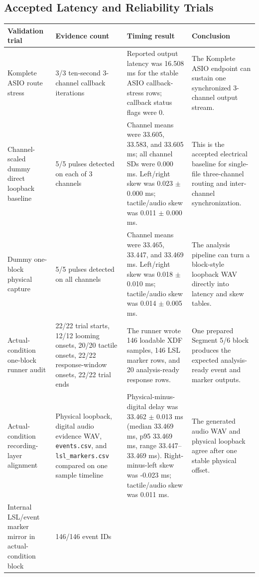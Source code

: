 \documentclass[11pt]{article}
\begin{document}
\subsection{Accepted Latency and Reliability Trials}

\begin{longtable}{|p{}|p{}|p{}|p{}|}
\hline
\textbf{Validation trial} & \textbf{Evidence count} & \textbf{Timing result} & \textbf{Conclusion} \\
\hline
Komplete ASIO route stress & 3/3 ten-second 3-channel callback iterations &
Reported output latency was 16.508 ms for the stable ASIO callback-stress
rows; callback status flags were 0. & The Komplete ASIO endpoint can sustain
one synchronized 3-channel output stream. \\
\hline
Channel-scaled dummy direct loopback baseline & 5/5 pulses detected on each of
3 channels & Channel means were 33.605, 33.583, and 33.605 ms; all channel SDs
were 0.000 ms. Left/right skew was 0.023 $\pm$ 0.000 ms; tactile/audio skew was
0.011 $\pm$ 0.000 ms. & This is the accepted electrical baseline for
single-file three-channel routing and inter-channel synchronization. \\
\hline
Dummy one-block physical capture & 5/5 pulses detected on all channels &
Channel means were 33.465, 33.447, and 33.469 ms. Left/right skew was
0.018 $\pm$ 0.010 ms; tactile/audio skew was 0.014 $\pm$ 0.005 ms. & The
analysis pipeline can turn a block-style loopback WAV directly into latency and
skew tables. \\
\hline
Actual-condition one-block runner audit & 22/22 trial starts, 12/12 looming
onsets, 20/20 tactile onsets, 22/22 response-window onsets, 22/22 trial ends &
The runner wrote 146 loadable XDF samples, 146 LSL marker rows, and 20
analysis-ready response rows. & One prepared Segment 5/6 block produces the
expected analysis-ready event and marker outputs. \\
\hline
Actual-condition recording-layer alignment & Physical loopback, digital audio
evidence WAV, \texttt{events.csv}, and \texttt{lsl\_markers.csv} compared on
one sample timeline & Physical-minus-digital delay was 33.462 $\pm$ 0.013 ms
(median 33.469 ms, p95 33.469 ms, range 33.447--33.469 ms). Right-minus-left
skew was -0.023 ms; tactile/audio skew was 0.011 ms. & The generated audio WAV
and physical loopback agree after one stable physical offset. \\
\hline
Internal LSL/event marker mirror in actual-condition block & 146/146 event IDs

\end{longtable}
\end{document}
